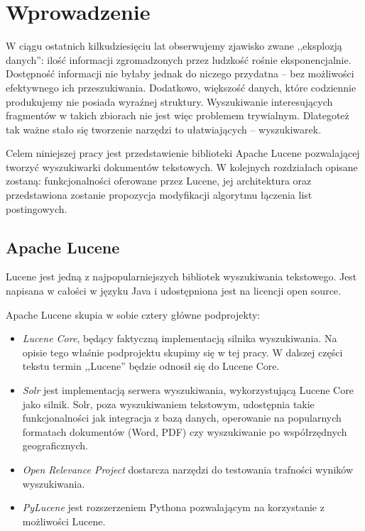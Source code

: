 \chapter{Wprowadzenie}

W ciągu ostatnich kilkudziesięciu lat obserwujemy zjawisko zwane ,,eksplozją danych'': ilość informacji zgromadzonych przez ludzkość rośnie eksponencjalnie. Dostępność informacji nie byłaby jednak do niczego przydatna -- bez możliwości efektywnego ich przeszukiwania. Dodatkowo, większość danych, które codziennie produkujemy nie posiada wyraźnej struktury.  Wyszukiwanie interesujących fragmentów w takich zbiorach nie jest więc problemem trywialnym. Dlategoteż tak ważne stało się tworzenie narzędzi to ułatwiających -- wyszukiwarek. 

Celem niniejszej pracy jest przedstawienie biblioteki Apache Lucene pozwalającej tworzyć wyszukiwarki dokumentów tekstowych. W kolejnych rozdziałach opisane zostaną: funkcjonalności oferowane przez Lucene, jej architektura oraz przedstawiona zostanie propozycja modyfikacji algorytmu łączenia list postingowych.

\section{Apache Lucene}

Lucene jest jedną z najpopularniejszych bibliotek wyszukiwania tekstowego. Jest napisana w całości w języku Java i udostępniona jest na licencji open source.

Apache Lucene skupia w sobie cztery główne podprojekty: 
\begin{itemize}
 \item \emph{Lucene Core}, będący faktyczną implementacją silnika wyszukiwania. Na opisie tego właśnie podprojektu skupimy się w tej pracy. W dalszej części tekstu termin ,,Lucene'' będzie odnosił się do Lucene Core.
 \item \emph{Solr} jest implementacją serwera wyszukiwania, wykorzystującą Lucene Core jako silnik. Solr, poza wyszukiwaniem tekstowym, udostępnia takie funkcjonalności jak integracja z bazą danych, operowanie na popularnych formatach dokumentów (Word, PDF) czy wyszukiwanie po współrzędnych geograficznych.
 \item \emph{Open Relevance Project} dostarcza narzędzi do testowania trafności wyników wyszukiwania.
 \item \emph{PyLucene} jest rozszerzeniem Pythona pozwalającym na korzystanie z możliwości Lucene.
\end{itemize}

